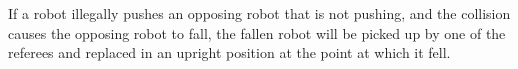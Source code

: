 \documentclass[12pt]{article}
\begin{document}
If a robot illegally pushes an opposing robot that is not pushing, and the collision causes the opposing robot to fall, the fallen robot will be picked up by one of the referees and replaced in an upright position at the point at which it fell.





%
%
%
%
%
\end{document}
